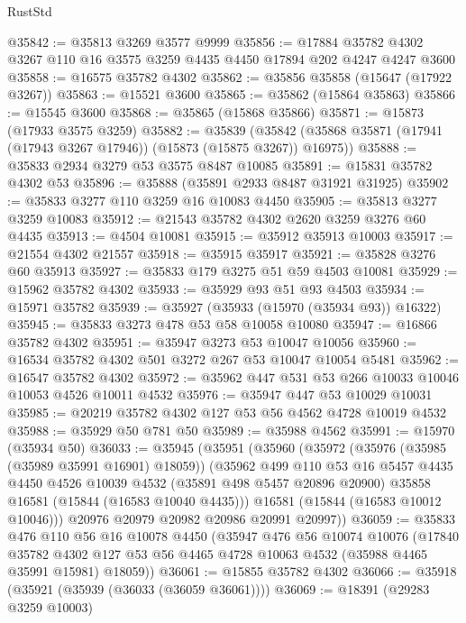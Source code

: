 \begin{lexlean}{RustStd}
\begin{coremodule}
@35842 := @35813 @3269 @3577 @9999
@35856 := @17884 @35782 @4302 @3267 @110 @16 @3575 @3259 @4435 @4450 @17894 @202 @4247 @4247 @3600
@35858 := @16575 @35782 @4302
@35862 := @35856 @35858 (@15647 (@17922 @3267))
@35863 := @15521 @3600
@35865 := @35862 (@15864 @35863)
@35866 := @15545 @3600
@35868 := @35865 (@15868 @35866)
@35871 := @15873 (@17933 @3575 @3259)
@35882 := @35839
    (@35842 (@35868 @35871 (@17941 (@17943 @3267 @17946)) (@15873 (@15875 @3267)) @16975))
@35888 := @35833 @2934 @3279 @53 @3575 @8487 @10085
@35891 := @15831 @35782 @4302 @53
@35896 := @35888 (@35891 @2933 @8487 @31921 @31925)
@35902 := @35833 @3277 @110 @3259 @16 @10083 @4450
@35905 := @35813 @3277 @3259 @10083
@35912 := @21543 @35782 @4302 @2620 @3259 @3276 @60 @4435
@35913 := @4504 @10081
@35915 := @35912 @35913 @10003
@35917 := @21554 @4302 @21557
@35918 := @35915 @35917
@35921 := @35828 @3276 @60 @35913
@35927 := @35833 @179 @3275 @51 @59 @4503 @10081
@35929 := @15962 @35782 @4302
@35933 := @35929 @93 @51 @93 @4503
@35934 := @15971 @35782
@35939 := @35927 (@35933 (@15970 (@35934 @93)) @16322)
@35945 := @35833 @3273 @478 @53 @58 @10058 @10080
@35947 := @16866 @35782 @4302
@35951 := @35947 @3273 @53 @10047 @10056
@35960 := @16534 @35782 @4302 @501 @3272 @267 @53 @10047 @10054 @5481
@35962 := @16547 @35782 @4302
@35972 := @35962 @447 @531 @53 @266 @10033 @10046 @10053 @4526 @10011 @4532
@35976 := @35947 @447 @53 @10029 @10031
@35985 := @20219 @35782 @4302 @127 @53 @56 @4562 @4728 @10019 @4532
@35988 := @35929 @50 @781 @50
@35989 := @35988 @4562
@35991 := @15970 (@35934 @50)
@36033 := @35945
    (@35951
      (@35960
        (@35972
          (@35976 (@35985 (@35989 @35991 @16901) @18059))
          (@35962
            @499
            @110
            @53
            @16
            @5457
            @4435
            @4450
            @4526
            @10039
            @4532
            (@35891 @498 @5457 @20896 @20900)
            @35858
            @16581
            (@15844 (@16583 @10040 @4435)))
          @16581
          (@15844 (@16583 @10012 @10046)))
        @20976
        @20979
        @20982
        @20986
        @20991
        @20997))
@36059 := @35833
    @476
    @110
    @56
    @16
    @10078
    @4450
    (@35947
      @476
      @56
      @10074
      @10076
      (@17840
        @35782
        @4302
        @127
        @53
        @56
        @4465
        @4728
        @10063
        @4532
        (@35988 @4465 @35991 @15981)
        @18059))
@36061 := @15855 @35782 @4302
@36066 := @35918 (@35921 (@35939 (@36033 (@36059 @36061))))
@36069 := @18391 (@29283 @3259 @10003)

\end{coremodule}
\end{lexlean}
